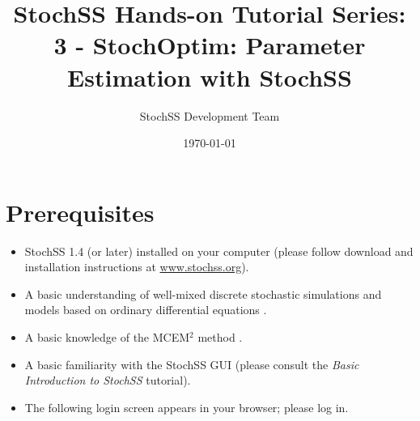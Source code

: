 \documentclass[12pt,notitlepage,nofootinbib]{revtex4}
\begin{document}
\title{StochSS Hands-on Tutorial Series: 3 - StochOptim: Parameter Estimation with StochSS}

\author{StochSS Development Team}

\date{\today}

\maketitle

\section{\label{sec:pre}Prerequisites}
\begin{itemize}
\item StochSS 1.4 (or later) installed on your computer (please follow download and installation instructions at \url{www.stochss.org}). 
\item A basic understanding of well-mixed discrete stochastic simulations and models based on ordinary differential equations \cite{dan,sundials}.
\item A basic knowledge of the MCEM$^2$ method \cite{bernie,dan,caffo}. 
\item  A basic familiarity with the StochSS GUI (please consult the \textit{Basic Introduction to StochSS} tutorial).
\item The following login screen appears in your browser; please log in.
\end{itemize}
\end{document}
